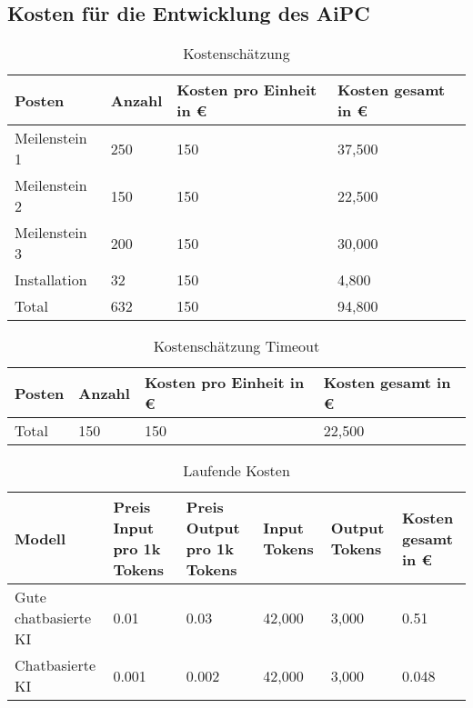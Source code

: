 \subsection{Kosten für die Entwicklung des AiPC}\label{subsec:kosten-fuer-die-entwicklung-des-aipc}
\begin{table}[H]
    \begin{tabularx}{\textwidth}{XXXX}
        \toprule
        \textbf{Posten} & \textbf{Anzahl} & \textbf{Kosten pro Einheit in €} & \textbf{Kosten gesamt in €} \\
        \midrule
        Meilenstein 1   & 250             & 150                              & 37,500                      \\
        Meilenstein 2   & 150             & 150                              & 22,500                      \\
        Meilenstein 3   & 200             & 150                              & 30,000                      \\
        Installation    & 32              & 150                              & 4,800                       \\
        \bottomrule
        Total           & 632             & 150                              & 94,800                      \\
        \bottomrule
    \end{tabularx}
    \caption{Kostenschätzung}
    \label{tab:kosten}
\end{table}

\begin{table}[H]
    \begin{tabularx}{\textwidth}{XXXX}
        \toprule
        \textbf{Posten} & \textbf{Anzahl} & \textbf{Kosten pro Einheit in €} & \textbf{Kosten gesamt in €} \\
        \midrule
        Total           & 150             & 150                              & 22,500                      \\
        \bottomrule
    \end{tabularx}
    \caption{Kostenschätzung Timeout}
    \label{tab:kosten-timeout}
\end{table}

\begin{table}[H]
    \begin{tabularx}{\textwidth}{XXXXXX}
        \toprule
        \textbf{Modell}      & \textbf{Preis Input pro 1k Tokens} & \textbf{Preis Output pro 1k Tokens} & \textbf{Input Tokens} & \textbf{Output Tokens}& \textbf{Kosten gesamt in €} \\
        \midrule
        Gute chatbasierte KI & 0.01                               & 0.03                                & 42,000                & 3,000                  & 0.51                        \\
        Chatbasierte KI      & 0.001                              & 0.002                               & 42,000                & 3,000                  & 0.048                       \\
        \bottomrule
    \end{tabularx}
    \caption{Laufende Kosten}
    \label{tab:kosten-laufend}
\end{table}

